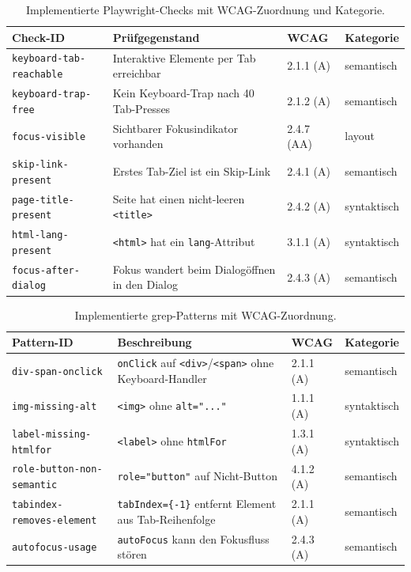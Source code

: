 \label{app:pw_grep_checks}

\begin{table}[htbp]
\centering
\small
\renewcommand{\arraystretch}{1.15}
\begin{tabular}{@{}llll@{}}
\toprule
\textbf{Check-ID} & \textbf{Prüfgegenstand} & \textbf{\ac{WCAG}} & \textbf{Kategorie} \\
\midrule
\texttt{keyboard-tab-reachable} & Interaktive Elemente per Tab erreichbar & 2.1.1 (A) & semantisch \\
\texttt{keyboard-trap-free} & Kein Keyboard-Trap nach 40 Tab-Presses & 2.1.2 (A) & semantisch \\
\texttt{focus-visible} & Sichtbarer Fokusindikator vorhanden & 2.4.7 (AA) & layout \\
\texttt{skip-link-present} & Erstes Tab-Ziel ist ein Skip-Link & 2.4.1 (A) & semantisch \\
\texttt{page-title-present} & Seite hat einen nicht-leeren \texttt{<title>} & 2.4.2 (A) & syntaktisch \\
\texttt{html-lang-present} & \texttt{<html>} hat ein \texttt{lang}-Attribut & 3.1.1 (A) & syntaktisch \\
\texttt{focus-after-dialog} & Fokus wandert beim Dialogöffnen in den Dialog & 2.4.3 (A) & semantisch \\
\bottomrule
\end{tabular}
\caption{Implementierte Playwright-Checks mit \acs{WCAG}-Zuordnung und Kategorie.}
\label{tab:pw-checks}
\end{table}

\begin{table}[htbp]
\centering
\small
\renewcommand{\arraystretch}{1.15}
\begin{tabular}{@{}lp{5.5cm}ll@{}}
\toprule
\textbf{Pattern-ID} & \textbf{Beschreibung} & \textbf{\ac{WCAG}} & \textbf{Kategorie} \\
\midrule
\texttt{div-span-onclick} & \texttt{onClick} auf \texttt{<div>}/\texttt{<span>} ohne Keyboard-Handler & 2.1.1 (A) & semantisch \\
\texttt{img-missing-alt} & \texttt{<img>} ohne \texttt{alt="..."} & 1.1.1 (A) & syntaktisch \\
\texttt{label-missing-htmlfor} & \texttt{<label>} ohne \texttt{htmlFor} & 1.3.1 (A) & syntaktisch \\
\texttt{role-button-non-semantic} & \texttt{role="button"} auf Nicht-Button & 4.1.2 (A) & semantisch \\
\texttt{tabindex-removes-element} & \texttt{tabIndex=\{-1\}} entfernt Element aus Tab-Reihenfolge & 2.1.1 (A) & semantisch \\
\texttt{autofocus-usage} & \texttt{autoFocus} kann den Fokusfluss stören & 2.4.3 (A) & semantisch \\
\bottomrule
\end{tabular}
\caption{Implementierte grep-Patterns mit \acs{WCAG}-Zuordnung.}
\label{tab:grep-patterns}
\end{table}

